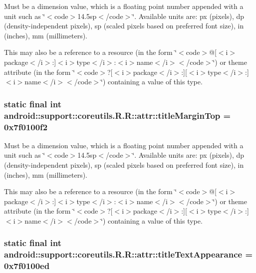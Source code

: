 Must be a dimension value, which is a floating point number appended with a unit such as \char`\"{}$<$code$>$14.5sp$<$/code$>$\char`\"{}. Available units are: px (pixels), dp (density-independent pixels), sp (scaled pixels based on preferred font size), in (inches), mm (millimeters). 

This may also be a reference to a resource (in the form \char`\"{}$<$code$>$@\mbox{[}$<$i$>$package$<$/i$>$:\mbox{]}$<$i$>$type$<$/i$>$:$<$i$>$name$<$/i$>$$<$/code$>$\char`\"{}) or theme attribute (in the form \char`\"{}$<$code$>$?\mbox{[}$<$i$>$package$<$/i$>$:\mbox{]}\mbox{[}$<$i$>$type$<$/i$>$:\mbox{]}$<$i$>$name$<$/i$>$$<$/code$>$\char`\"{}) containing a value of this type. \hypertarget{classandroid_1_1support_1_1coreutils_1_1_r_1_1attr_ebff9af967df4f8d0ab639fb384d2200}{
\subsubsection[{titleMarginTop}]{\setlength{\rightskip}{0pt plus 5cm}static final int android::support::coreutils.R.R::attr::titleMarginTop = 0x7f0100f2}}
\label{classandroid_1_1support_1_1coreutils_1_1_r_1_1attr_ebff9af967df4f8d0ab639fb384d2200}


Must be a dimension value, which is a floating point number appended with a unit such as \char`\"{}$<$code$>$14.5sp$<$/code$>$\char`\"{}. Available units are: px (pixels), dp (density-independent pixels), sp (scaled pixels based on preferred font size), in (inches), mm (millimeters). 

This may also be a reference to a resource (in the form \char`\"{}$<$code$>$@\mbox{[}$<$i$>$package$<$/i$>$:\mbox{]}$<$i$>$type$<$/i$>$:$<$i$>$name$<$/i$>$$<$/code$>$\char`\"{}) or theme attribute (in the form \char`\"{}$<$code$>$?\mbox{[}$<$i$>$package$<$/i$>$:\mbox{]}\mbox{[}$<$i$>$type$<$/i$>$:\mbox{]}$<$i$>$name$<$/i$>$$<$/code$>$\char`\"{}) containing a value of this type. \hypertarget{classandroid_1_1support_1_1coreutils_1_1_r_1_1attr_c3f19e0cd93b0fd279c0ffc3c668775a}{
\subsubsection[{titleTextAppearance}]{\setlength{\rightskip}{0pt plus 5cm}static final int android::support::coreutils.R.R::attr::titleTextAppearance = 0x7f0100ed}}
\label{classandroid_1_1support_1_1coreutils_1_1_r_1_1attr_c3f19e0cd93b0fd279c0ffc3c668775a}


